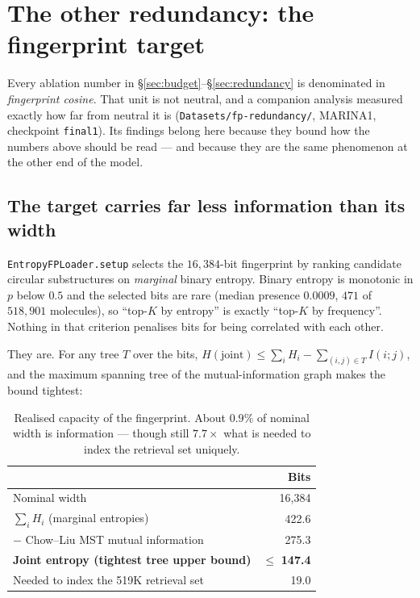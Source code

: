 \documentclass[11pt]{article}
\theoremstyle{plain}
\theoremstyle{remark}
\newcommand{\code}[1]{\texttt{\small #1}}
\begin{document}
\FloatBarrier
\section{The other redundancy: the fingerprint target}
\label{sec:fpredundancy}

Every ablation number in \S\ref{sec:budget}--\S\ref{sec:redundancy} is
denominated in \emph{fingerprint cosine}. That unit is not neutral, and a
companion analysis measured exactly how far from neutral it is
(\code{Datasets/fp-redundancy/}, MARINA1, checkpoint \code{final1}). Its
findings belong here because they bound how the numbers above should be read
--- and because they are the same phenomenon at the other end of the model.

\subsection{The target carries far less information than its width}

\code{EntropyFPLoader.setup} selects the $16{,}384$-bit fingerprint by ranking
candidate circular substructures on \emph{marginal} binary entropy. Binary
entropy is monotonic in $p$ below $0.5$ and the selected bits are rare (median
presence $0.0009$, $471$ of $518{,}901$ molecules), so ``top-$K$ by entropy''
is exactly ``top-$K$ by frequency''. Nothing in that criterion penalises bits
for being correlated with each other.

They are. For any tree $T$ over the bits,
$H(\text{joint}) \le \sum_i H_i - \sum_{(i,j) \in T} I(i;j)$, and the maximum
spanning tree of the mutual-information graph makes the bound tightest:

\begin{table}[htbp]
\centering
\small
\caption{Realised capacity of the fingerprint. About $0.9\%$ of nominal width
is information --- though still $7.7\times$ what is needed to index the
retrieval set uniquely.}
\label{tab:fpcapacity}
\begin{tabular}{@{}l r@{}}
\toprule
& Bits \\
\midrule
Nominal width & 16{,}384 \\
$\sum_i H_i$ (marginal entropies) & 422.6 \\
$-$ Chow--Liu MST mutual information & 275.3 \\
\textbf{Joint entropy (tightest tree upper bound)} & $\le$ \textbf{147.4} \\
Needed to index the 519K retrieval set & 19.0 \\
\bottomrule
\end{tabular}
\end{table}
\end{document}
